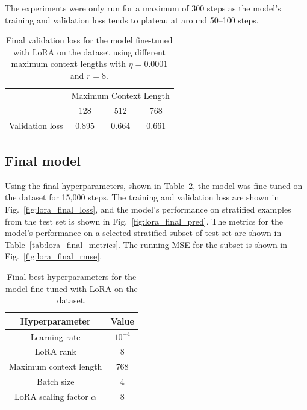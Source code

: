 \documentclass[11pt,a4paper]{article}
\begin{document}
The experiments were only run for a maximum of 300 steps as the model's training and validation loss tends to plateau at around 50--100 steps.

\begin{table}[h]
    \centering
    \begin{tabular}{c|c|c|c}
        & \multicolumn{3}{|c}{Maximum Context Length} \\
        & 128 & 512 & 768 \\
        \hline
        Validation loss & 0.895 & 0.664 & 0.661 \\
    \end{tabular}
    \caption{Final validation loss for the model fine-tuned with LoRA on the dataset using different maximum context lengths with $\eta=0.0001$ and $r=8$.}
    \label{tab:lora_max_context}
\end{table}

\clearpage
\subsection{Final model}
\label{sec:final_model}
Using the final hyperparameters, shown in Table~\ref{tab:lora_final_hyperparameters}, the model was fine-tuned on the dataset for 15,000 steps. The training and validation loss are shown in Fig.~\ref{fig:lora_final_loss}, and the model's performance on stratified examples from the test set is shown in Fig.~\ref{fig:lora_final_pred}. The metrics for the model's performance on a selected stratified subset of test set are shown in Table~\ref{tab:lora_final_metrics}. The running MSE for the subset is shown in Fig.~\ref{fig:lora_final_rmse}.

\begin{table}[h]
    \centering
    \begin{tabular}{c|c}
        Hyperparameter & Value \\
        \hline
        Learning rate & $10^{-4}$ \\
        LoRA rank & 8 \\
        Maximum context length & 768 \\
        Batch size & 4 \\
        LoRA scaling factor $\alpha$ & 8 \\
    \end{tabular}
    \caption{Final best hyperparameters for the model fine-tuned with LoRA on the dataset.}\label{tab:lora_final_hyperparameters}
\end{table}
\end{document}
